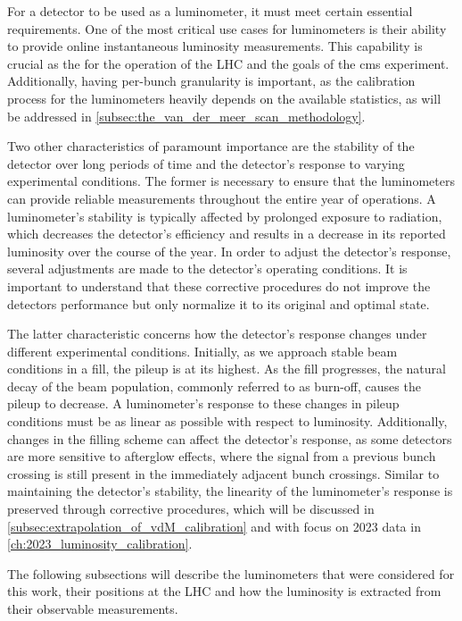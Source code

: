 For a detector to be used as a luminometer, it must meet certain essential requirements. One of the most critical use cases for luminometers is their ability to provide online instantaneous luminosity measurements. This capability is crucial as the for the operation of the LHC and the goals of the \acrshort{cms} experiment. Additionally, having per-bunch granularity is important, as the calibration process for the luminometers heavily depends on the available statistics, as will be addressed in \autoref{subsec:the_van_der_meer_scan_methodology}.

Two other characteristics of paramount importance are the stability of the detector over long periods of time and the detector’s response to varying experimental conditions. The former is necessary to ensure that the luminometers can provide reliable measurements throughout the entire year of operations. A luminometer’s stability is typically affected by prolonged exposure to radiation, which decreases the detector’s efficiency and results in a decrease in its reported luminosity over the course of the year. In order to adjust the detector’s response, several adjustments are made to the detector’s operating conditions. It is important to understand that these corrective procedures do not improve the detectors performance but only normalize it to its original and optimal state.

The latter characteristic concerns how the detector’s response changes under different experimental conditions. Initially, as we approach stable beam conditions in a fill, the pileup is at its highest. As the fill progresses, the natural decay of the beam population, commonly referred to as burn-off, causes the pileup to decrease. A luminometer’s response to these changes in pileup conditions must be as linear as possible with respect to luminosity. Additionally, changes in the filling scheme can affect the detector’s response, as some detectors are more sensitive to afterglow effects, where the signal from a previous bunch crossing is still present in the immediately adjacent bunch crossings. Similar to maintaining the detector's stability, the linearity of the luminometer’s response is preserved through corrective procedures, which will be discussed in \autoref{subsec:extrapolation_of_vdM_calibration} and with focus on 2023 data in \autoref{ch:2023_luminosity_calibration}.

The following subsections will describe the luminometers that were considered for this work, their positions at the LHC and how the luminosity is extracted from their observable measurements.

